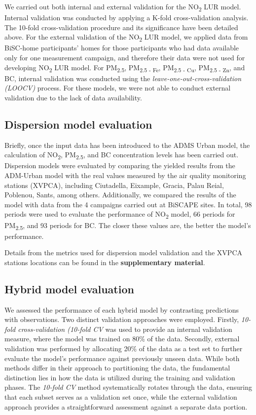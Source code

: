 \documentclass{article}
\begin{document}
We carried out both internal and external validation for the NO\textsubscript{2} LUR model. Internal validation was conducted by applying a K-fold cross-validation analysis. The 10-fold cross-validation procedure and its significance have been detailed above. For the external validation of the NO\textsubscript{2} LUR model, we applied data from BiSC-home participants' homes for those participants who had data available only for one measurement campaign, and therefore their data were not used for developing NO\textsubscript{2} LUR model. For PM\textsubscript{2.5}, PM\textsubscript{2.5 - Fe}, PM\textsubscript{2.5 - Cu}, PM\textsubscript{2.5 - Zn}, and BC, internal validation was conducted using the \textit{leave-one-out-cross-validation (LOOCV)} process. For these models, we were not able to conduct external validation due to the lack of data availability.

\subsection{Dispersion model evaluation}
 Briefly, once the input data has been introduced to the ADMS Urban model, the calculation of NO\textsubscript{2}, PM\textsubscript{2.5}, and BC concentration levels has been carried out. Dispersion models were evaluated by comparing the yielded results from the ADM-Urban model with the real values measured by the air quality monitoring stations (XVPCA), including Ciutadella, Eixample, Gracia, Palau Reial, Poblenou, Sants, among others. Additionally, we compared the results of the model with data from the 4 campaigns carried out at BiSCAPE sites. In total, 98 periods were used to evaluate the performance of NO\textsubscript{2} model, 66 periods for PM\textsubscript{2.5}, and 93 periods for BC. The closer these values are, the better the model's performance. 

Details from the metrics used for dispersion model validation and the XVPCA stations locations can be found in the \textbf{supplementary material}.\vspace{0.5cm}

\subsection{Hybrid model evaluation}
We assessed the performance of each hybrid model by contrasting predictions with observations. Two distinct validation approaches were employed. Firstly, \textit{10-fold cross-validation (10-fold CV} was used to provide an internal validation measure, where the model was trained on 80\% of the data. Secondly, external validation was performed by allocating 20\% of the data as a test set to further evaluate the model's performance against previously unseen data. While both methods differ in their approach to partitioning the data, the fundamental distinction lies in how the data is utilized during the training and validation phases. The \textit{10-fold CV} method systematically rotates through the data, ensuring that each subset serves as a validation set once, while the external validation approach provides a straightforward assessment against a separate data portion. 
\end{document}
